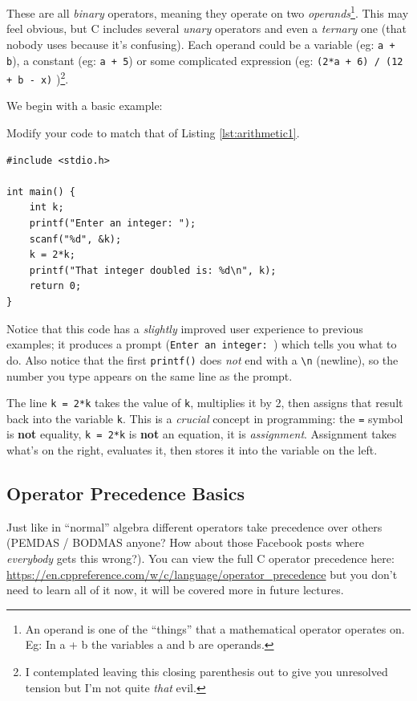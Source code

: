 \documentclass{lab}
\begin{document}
These are all \textit{binary} operators, meaning they operate on two \textit{operands}\footnote{An operand is one of the ``things'' that a mathematical operator operates on. Eg: In a + b the variables a and b are operands.}. This may feel obvious, but C includes several \textit{unary} operators and even a \textit{ternary} one (that nobody uses because it's confusing). Each operand could be a variable (eg: \texttt{a + b}), a constant (eg: \texttt{a + 5}) or some complicated expression (eg: \texttt{(2*a + 6) / (12 + b - x)} )\footnote{I contemplated leaving this closing parenthesis out to give you unresolved tension but I'm not quite \textit{that} evil.}.

We begin with a basic example:

\begin{task}{}{}
Modify your code to match that of Listing \ref{lst:arithmetic1}.

\begin{lstlisting}[style=CStyle,caption=A basic arithmetic example,label=lst:arithmetic1]
#include <stdio.h>

int main() {
	int k;
	printf("Enter an integer: ");
	scanf("%d", &k);
	k = 2*k;
	printf("That integer doubled is: %d\n", k);
	return 0;
}
\end{lstlisting}
\end{task}

Notice that this code has a \textit{slightly} improved user experience to previous examples; it produces a prompt (\texttt{Enter an integer: }) which tells you what to do. Also notice that the first \texttt{printf()} does \textit{not} end with a \texttt{\textbackslash n} (newline), so the number you type appears on the same line as the prompt.

The line \texttt{k = 2*k} takes the value of \texttt{k}, multiplies it by 2, then assigns that result back into the variable \texttt{k}. This is a \textit{crucial} concept in programming: the \texttt{=} symbol is \textbf{not} equality, \texttt{k = 2*k} is \textbf{not} an equation, it is \textit{assignment}. Assignment takes what's on the right, evaluates it, then stores it into the variable on the left.

\subsection{Operator Precedence Basics}

Just like in ``normal'' algebra different operators take precedence over others (PEMDAS / BODMAS anyone? How about those Facebook posts where \textit{everybody} gets this wrong?). You can view the full C operator precedence here: \url{https://en.cppreference.com/w/c/language/operator_precedence} but you don't need to learn all of it now, it will be covered more in future lectures.
\end{document}
